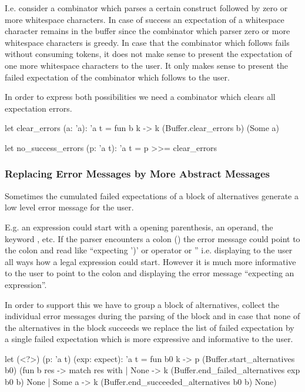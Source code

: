 I.e. consider a combinator which parses a certain construct followed by zero
or more whitespace characters. In case of success an expectation of a
whitespace character remains in the buffer since the combinator which parser
zero or more whitespace characters is greedy. In case that the combinator
which follows fails without consuming tokens, it does not make sense to present
the expectation of one more whitespace characters to the user. It only makes
sense to present the failed expectation of the combinator which follows to the
user.

In order to express both possibilities we need a combinator which clears all
expectation errors.

\begin{ocaml}
  let clear_errors (a: 'a): 'a t =
    fun b k -> k (Buffer.clear_errors b) (Some a)

  let no_success_errors (p: 'a t): 'a t =
    p >>= clear_errors
\end{ocaml}



\subsubsection{Replacing Error Messages by More Abstract Messages}


Sometimes the cumulated failed expectations of a block of alternatives
generate a low level error message for the user.

E.g. an expression could start with a opening parenthesis, an operand, the
keyword , etc. If the parser encounters a colon (\code{:}) the error
message could point to the colon and read like ``expecting ')' or operator or
'' i.e. displaying to the user all ways how a legal expression could
start. However it is much more informative to the user to point to the colon
and displaying the error message ``expecting an expression''.

In order to support this we have to group a block of alternatives, collect the
individual error messages during the parsing of the block and in case that
none of the alternatives in the block succeeds we replace the list of failed
expectation by a single failed expectation which is more expressive and
informative to the user.

\begin{ocaml}
  let (<?>) (p: 'a t) (exp: expect): 'a t =
    fun b0 k ->
      p (Buffer.start_alternatives b0)
        (fun b res ->
           match res with
           | None ->
               k (Buffer.end_failed_alternatives exp b0 b) None
           | Some a ->
               k (Buffer.end_succeeded_alternatives b0 b) None)
\end{ocaml}






